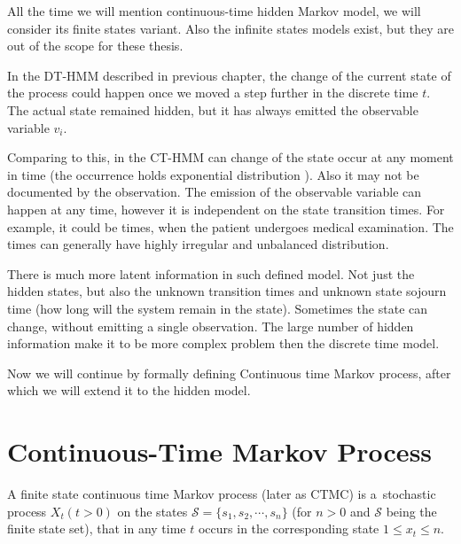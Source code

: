 \documentclass[thesis=M,english]{FITthesis}[2012/10/20]
\begin{document}
All the time we will mention continuous-time hidden Markov model, we will consider its finite states variant. Also the infinite states models exist, but they are out of the scope for these thesis.

In the DT-HMM described in previous chapter, the change of the current state of the process could happen once we moved a step further in the discrete time $t$. The actual state remained hidden, but it has always emitted the observable variable $v_i$.

Comparing to this, in the CT-HMM can change of the state occur at any moment in time (the occurrence holds exponential distribution ). Also it may not be documented by the observation. The emission of the observable variable can happen at any time, however it is independent on the state transition times. For example, it could be times, when the patient undergoes medical examination. The times can generally have highly irregular and unbalanced distribution.

There is much more latent information in such defined model. Not just the hidden states, but also the unknown transition times and unknown state sojourn time (how long will the system remain in the state).
Sometimes the state can change, without emitting a single observation. The large number of hidden information make it to be more complex problem then the discrete time model.

Now we will continue by formally defining Continuous time Markov process, after which we will extend it to the hidden model.

\section{Continuous-Time Markov Process} 

A finite state continuous time Markov process (later as CTMC) is a~stochastic process $X_t (t > 0)$ on the states $\mathcal{S} = \{ s_1, s_2, \cdots, s_n \}$  (for $n>0$ and $\mathcal{S}$ being the finite state set), that in any time $t$  occurs in the corresponding state $1 \leq x_t \leq n$. 
\end{document}

